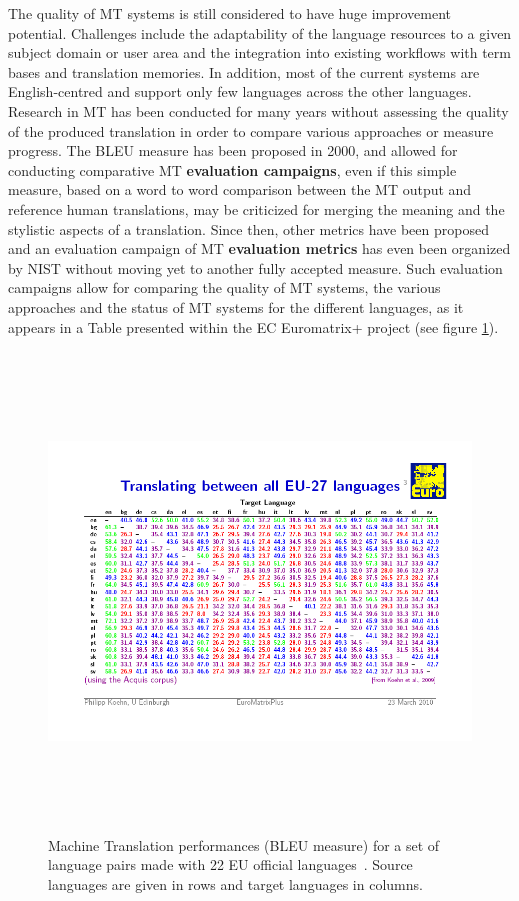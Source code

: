 \documentclass[]{../metanetpaper}
\begin{document}
\begin{multicols}{2}
The quality of MT systems is still considered to have huge improvement
potential. Challenges include the adaptability of the language
resources to a given subject domain or user area and the integration
into existing workflows with term bases and translation memories. In
addition, most of the current systems are English-centred and support
only few languages across the other languages. Research in MT has been
conducted for many years without assessing the quality of the produced
translation in order to compare various approaches or measure
progress. The BLEU measure has been proposed in 2000\cite{bleu02}, and allowed for
conducting comparative MT {\bf evaluation campaigns}, even if this simple
measure, based on a word to word comparison between the MT output and
reference human translations, may be criticized for merging the
meaning and the stylistic aspects of a translation. Since then, other
metrics have been proposed and an evaluation campaign of MT {\bf evaluation
metrics} has even been organized by NIST without moving yet to another
fully accepted measure. Such evaluation campaigns allow for comparing
the quality of MT systems, the various approaches and the status of MT
systems for the different languages, as it appears in a Table
presented within the EC Euromatrix+ project (see figure \ref{fig:euromatrixplus}).

\begin{figure}[!ht]
\begin{center}
  \includegraphics[height=5.0in]{../_media/french/french_table1_mt_matrix.png}
  \caption{Machine Translation performances (BLEU measure) for a set of language pairs made with 22 EU official languages~\cite{mt462}. Source languages are given in rows and target languages in columns.}
  \label{fig:euromatrixplus}
\end{center}
\end{figure}


\end{multicols}
\end{document}
